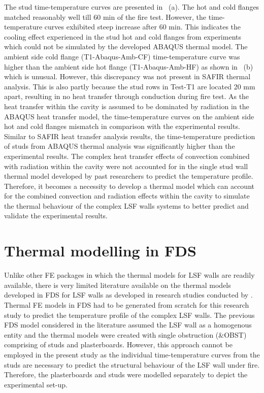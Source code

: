 The stud time-temperature curves are presented in ~(a). The hot and cold flanges matched reasonably well till 60 min of the fire test. However, the time-temperature curves exhibited steep increase after 60 min. This indicates the cooling effect experienced in the stud hot and cold flanges from experiments which could not be simulated by the developed ABAQUS thermal model. The ambient side cold flange (T1-Abaqus-Amb-CF) time-temperature curve was higher than the ambient side hot flange (T1-Abaqus-Amb-HF) as shown in ~(b) which is unusual. However, this discrepancy was not present in SAFIR thermal analysis. This is also partly because the stud rows in Test-T1 are located 20 mm apart, resulting in no heat transfer through conduction during fire test. As the heat transfer within the cavity is assumed to be dominated by radiation in the ABAQUS heat transfer model, the time-temperature curves on the ambient side hot and cold flanges mismatch in comparison with the experimental results. Similar to SAFIR heat transfer analysis results, the time-temperature prediction of studs from ABAQUS thermal analysis was significantly higher than the experimental results. The complex heat transfer effects of convection combined with radiation within the cavity were not accounted for in the single stud wall thermal model developed by past researchers to predict the temperature profile. Therefore, it becomes a necessity to develop a thermal model which can account for the combined convection and radiation effects within the cavity to simulate the thermal behaviour of the complex LSF walls systems to better predict and validate the experimental results. 

\section{Thermal modelling in FDS}

Unlike other FE packages in which the thermal models for LSF walls are readily available, there is very limited literature available on the thermal models developed in FDS for LSF walls as developed in research studies conducted by \citet{Lazaro2016,Lazaro2018}. Thermal FE models in FDS had to be generated from scratch for this research study to predict the temperature profile of the complex LSF walls. The previous FDS model considered in the literature assumed the LSF wall as a homogenous entity and the thermal models were created with single obstruction (\&OBST) comprising of studs and plasterboards. However, this approach cannot be employed in the present study as the individual time-temperature curves from the studs are necessary to predict the structural behaviour of the LSF wall under fire. Therefore, the plasterboards and studs were modelled separately to depict the experimental set-up. 

